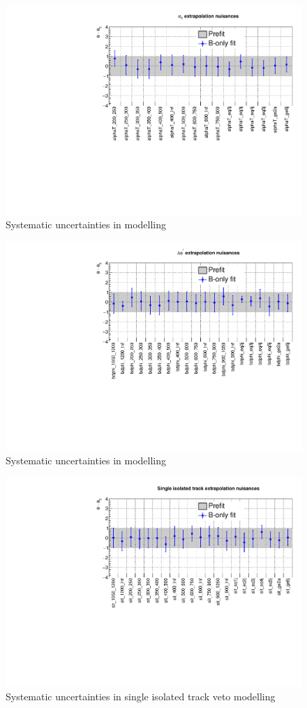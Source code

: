 \clearpage
\begin{figure}[h!]
  \centering
  \caption{Systematic uncertainties in \alphat modelling}
  \includegraphics[width=0.8\linewidth]{figures/results/36invfb_approval/postfit/nuis/AlphaT_nuisances}
\end{figure}

\begin{figure}[h!]
  \centering
  \caption{Systematic uncertainties in \bdphi modelling}
  \includegraphics[width=0.8\linewidth]{figures/results/36invfb_approval/postfit/nuis/bDPhi_nuisances}
\end{figure}

\clearpage
\begin{figure}[h!]
  \centering
  \caption{Systematic uncertainties in single isolated track veto modelling}
  \includegraphics[width=0.8\linewidth]{figures/results/36invfb_approval/postfit/nuis/SIT_nuisances}
\end{figure}

